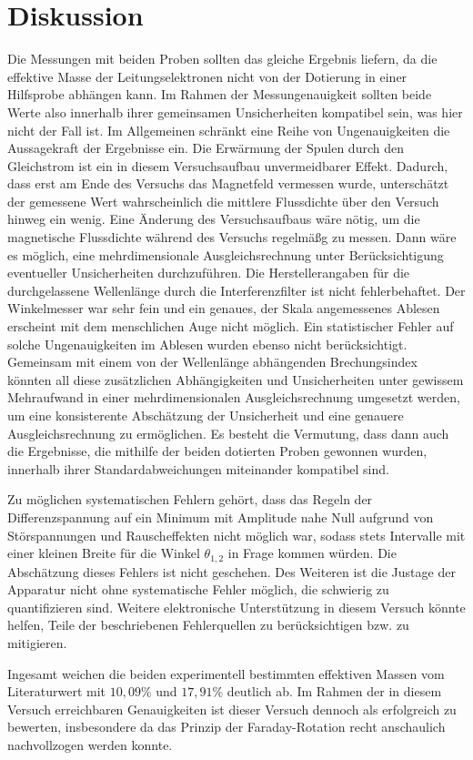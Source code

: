 \section{Diskussion}
\label{sec:Diskussion}

Die Messungen mit beiden Proben sollten das gleiche Ergebnis liefern, da die effektive Masse der Leitungselektronen nicht von der Dotierung in einer Hilfsprobe abhängen kann. Im Rahmen der Messungenauigkeit sollten beide Werte also innerhalb ihrer gemeinsamen Unsicherheiten kompatibel sein, was hier nicht der Fall ist. Im Allgemeinen schränkt eine Reihe von Ungenauigkeiten die Aussagekraft der Ergebnisse ein. Die Erwärmung der Spulen durch den Gleichstrom ist ein in diesem Versuchsaufbau unvermeidbarer Effekt. Dadurch, dass erst am Ende des Versuchs das Magnetfeld vermessen wurde, unterschätzt der gemessene Wert wahrscheinlich die mittlere Flussdichte über den Versuch hinweg ein wenig. Eine Änderung des Versuchsaufbaus wäre nötig, um die magnetische Flussdichte während des Versuchs regelmäßg zu messen. Dann wäre es möglich, eine mehrdimensionale Ausgleichsrechnung unter Berücksichtigung eventueller Unsicherheiten durchzuführen. Die Herstellerangaben für die durchgelassene Wellenlänge durch die Interferenzfilter ist nicht fehlerbehaftet. Der Winkelmesser war sehr fein und ein genaues, der Skala angemessenes Ablesen erscheint mit dem menschlichen Auge nicht möglich. Ein statistischer Fehler auf solche Ungenauigkeiten im Ablesen wurden ebenso nicht berücksichtigt.
Gemeinsam mit einem von der Wellenlänge abhängenden Brechungsindex könnten all diese zusätzlichen Abhängigkeiten und Unsicherheiten unter gewissem Mehraufwand in einer mehrdimensionalen Ausgleichsrechnung umgesetzt werden, um eine konsisterente Abschätzung der Unsicherheit und eine genauere Ausgleichsrechnung zu ermöglichen. Es besteht die Vermutung, dass dann auch die Ergebnisse, die mithilfe der beiden dotierten Proben gewonnen wurden, innerhalb ihrer Standardabweichungen miteinander kompatibel sind.

Zu möglichen systematischen Fehlern gehört, dass das Regeln der Differenzspannung auf ein Minimum mit Amplitude nahe Null aufgrund von Störspannungen und Rauscheffekten nicht möglich war, sodass stets Intervalle mit einer kleinen Breite für die Winkel $\theta_{1,2}$ in Frage kommen würden. Die Abschätzung dieses Fehlers ist nicht geschehen. Des Weiteren ist die Justage der Apparatur nicht ohne systematische Fehler möglich, die schwierig zu quantifizieren sind. Weitere elektronische Unterstützung in diesem Versuch könnte helfen, Teile der beschriebenen Fehlerquellen zu berücksichtigen bzw. zu mitigieren.

Ingesamt weichen die beiden experimentell bestimmten effektiven Massen vom Literaturwert mit $10{,}09\%$ und $17{,}91\%$ deutlich ab. Im Rahmen der in diesem Versuch erreichbaren Genauigkeiten ist dieser Versuch dennoch als erfolgreich zu bewerten, insbesondere da das Prinzip der Faraday-Rotation recht anschaulich nachvollzogen werden konnte.
